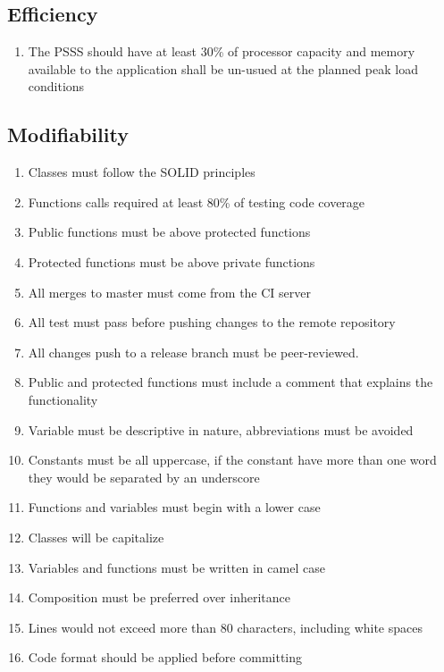 \subsection{Efficiency}
\begin{enumerate}[label=SEC-\arabic*]
    \item The PSSS should have at least 30\% of processor capacity and memory 
    available to the application shall be un-usued at the planned 
    peak load conditions
\end{enumerate}

\subsection{Modifiability}
\begin{enumerate}[label=SEC-\arabic*]
    \item Classes must follow the SOLID principles
    \item Functions calls required at least 80\% of testing code coverage
    \item Public functions must be above protected functions
    \item Protected functions must be above private functions
    \item All merges to master must come from the CI server
    \item All test must pass before pushing changes to the remote repository
    \item All changes push to a release branch must be peer-reviewed.
    \item Public and protected functions must include a comment that explains 
    the functionality
    \item Variable must be descriptive in nature, abbreviations must be avoided
    \item Constants must be all uppercase, if the constant have more than one 
    word they would be separated by an underscore
    \item Functions and variables must begin with a lower case
    \item Classes will be capitalize
    \item Variables and functions must be written in camel case
    \item Composition must be preferred over inheritance
    \item Lines would not exceed more than 80 characters, including white 
    spaces
    \item Code format should be applied before committing
\end{enumerate}

